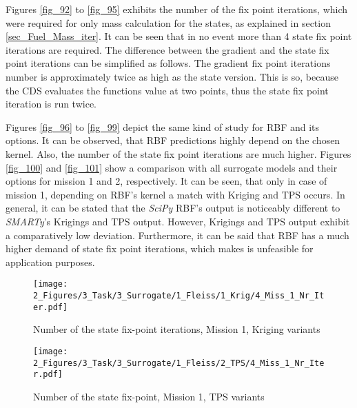  \FloatBarrier
Figures \ref{fig_92} to \ref{fig_95} exhibits the number of 
the fix point iterations, which were required for 
only mass calculation for the states, as explained 
in section \ref{sec_Fuel_Mass_iter}. It can be 
seen that in no event more than 4 state fix point 
iterations are required. The difference between the 
gradient and the state fix point iterations can 
be simplified as follows. The gradient fix point iterations number 
is approximately twice as high as the state version. This is so, because 
the CDS evaluates the functions 
value at two points, thus the state fix point iteration 
is run twice.\newline

Figures \ref{fig_96} to \ref{fig_99} depict the same 
kind of study for RBF and its options.
It can be observed, that RBF predictions highly depend on the chosen 
kernel. Also, the number of the state fix point iterations are much 
higher.
Figures \ref{fig_100} and \ref{fig_101} show a comparison 
with all surrogate models and their options for 
mission 1 and 2, respectively. It can be seen, that 
only in case of mission 1, depending 
on RBF's kernel a match with Kriging and TPS 
occurs. In general, it can be stated that the
\emph{SciPy} RBF's output is noticeably different to 
\emph{SMARTy}'s Krigings and 
TPS output. However, Krigings and TPS output 
exhibit a comparatively low deviation. Furthermore, 
it can be said that RBF has a much higher demand of 
state fix point iterations, which makes is 
unfeasible for application purposes.

\FloatBarrier
 \begin{figure}[!h]
    \begin{minipage}[h]{0.46\textwidth}
        \centering
        \texttt{[image: 2\_Figures/3\_Task/3\_Surrogate/1\_Fleiss/1\_Krig/4\_Miss\_1\_Nr\_Iter.pdf]}
        \caption{Number of the state fix-point iterations, Mission 1, Kriging variants}
        \label{fig_92}    
    \end{minipage}
    \hfill
    \begin{minipage}{0.46\textwidth}
        \centering
        \texttt{[image: 2\_Figures/3\_Task/3\_Surrogate/1\_Fleiss/2\_TPS/4\_Miss\_1\_Nr\_Iter.pdf]}
        \caption{Number of the state fix-point, Mission 1, TPS variants}
        \label{fig_93}    
    \end{minipage}
\end{figure} 

